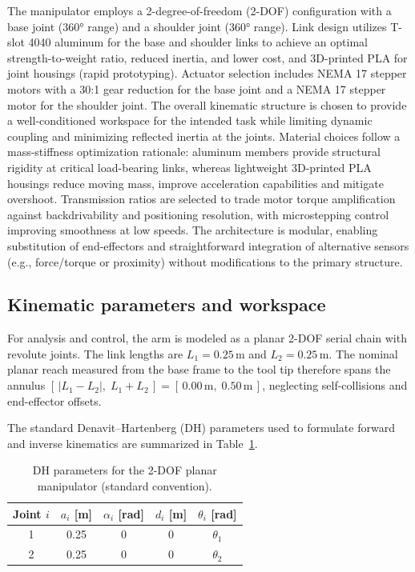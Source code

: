 The manipulator employs a 2-degree-of-freedom (2-DOF) configuration with a base joint (360° range) and a shoulder joint (360° range).
Link design utilizes T-slot 4040 aluminum for the base and shoulder links to achieve an optimal strength-to-weight ratio, reduced inertia, and lower cost, and
3D-printed PLA for joint housings (rapid prototyping). Actuator
selection includes NEMA 17 stepper motors with a 30:1 gear reduction for the base joint and a NEMA 17 stepper motor for the shoulder joint.
The overall kinematic structure is chosen to provide a well-conditioned workspace for the intended task while limiting dynamic coupling
and minimizing reflected inertia at the joints. Material choices follow a mass-stiffness optimization rationale: aluminum members provide
structural rigidity at critical load-bearing links, whereas lightweight 3D-printed PLA housings reduce moving mass, improve acceleration capabilities and
mitigate overshoot. Transmission ratios are selected to trade motor torque amplification against backdrivability and positioning
resolution, with microstepping control improving smoothness at low speeds. The architecture is modular, enabling substitution
of end-effectors and straightforward integration of alternative sensors (e.g., force/torque or proximity) without modifications 
to the primary structure.

\subsection*{Kinematic parameters and workspace}
For analysis and control, the arm is modeled as a planar 2-DOF serial chain with revolute joints. The link lengths are
\(L_1 = 0.25\,\mathrm{m}\) and \(L_2 = 0.25\,\mathrm{m}\). The nominal planar reach measured from the base frame to the tool tip therefore spans the annulus
\([\,|L_1-L_2|,\; L_1+L_2\,] = [\,0.00\,\mathrm{m},\; 0.50\,\mathrm{m}\,]\), neglecting self-collisions and end-effector offsets.

The standard Denavit--Hartenberg (DH) parameters used to formulate forward and inverse kinematics are summarized in Table~\ref{tab:dh_params}.

\begin{table}[H]
\centering
\caption{DH parameters for the 2-DOF planar manipulator (standard convention).}
\label{tab:dh_params}
\begin{tabular}{|c|c|c|c|c|}
\hline
Joint $i$ & $a_i$ [m] & $\alpha_i$ [rad] & $d_i$ [m] & $\theta_i$ [rad] \\
\hline
1 & 0.25 & 0 & 0 & $\theta_1$ \\
2 & 0.25 & 0 & 0 & $\theta_2$ \\
\hline
\end{tabular}
\end{table}

